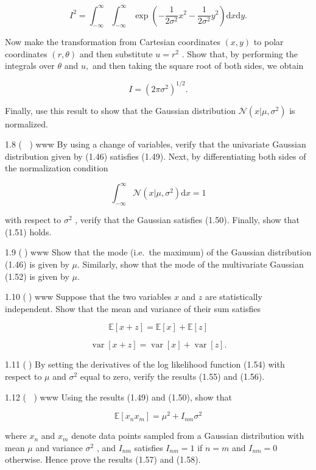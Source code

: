 \documentclass[
  10
]{article}
\begin{document}
\[
I ^ {2} = \int_ {- \infty} ^ {\infty} \int_ {- \infty} ^ {\infty} \exp \left(- \frac {1}{2 \sigma^ {2}} x ^ {2} - \frac {1}{2 \sigma^ {2}} y ^ {2}\right) \mathrm{d} x \mathrm{d} y.\tag{1.125}
\]

Now make the transformation from Cartesian coordinates \(( x , y )\) to
polar coordinates \(( r , \theta )\) and then substitute
\(u = r ^ { 2 }\) . Show that, by performing the integrals over
\(\theta\) and \(u ,\) and then taking the square root of both sides, we
obtain

\[
I = \left(2 \pi \sigma^ {2}\right) ^ {1 / 2}.\tag{1.126}
\]

Finally, use this result to show that the Gaussian distribution
\(\mathcal { N } ( x | \mu , \sigma ^ { 2 } )\) is normalized.

1.8 ( ) www By using a change of variables, verify that the univariate
Gaussian distribution given by (1.46) satisfies (1.49). Next, by
differentiating both sides of the normalization condition

\[
\int_ {- \infty} ^ {\infty} \mathcal {N} (x | \mu , \sigma^ {2}) \mathrm{d} x = 1\tag{1.127}
\]

with respect to \(\sigma ^ { 2 }\) , verify that the Gaussian satisfies
(1.50). Finally, show that (1.51) holds.

1.9 () www Show that the mode (i.e.~the maximum) of the Gaussian
distribution (1.46) is given by \(\mu .\) Similarly, show that the mode
of the multivariate Gaussian (1.52) is given by \(\mu .\)

1.10 () www Suppose that the two variables \(x\) and \(z\) are
statistically independent. Show that the mean and variance of their sum
satisfies

\[
\mathbb {E} [ x + z ] = \mathbb {E} [ x ] + \mathbb {E} [ z ]\tag{1.128}
\]

\[
\operatorname{var} [ x + z ] = \operatorname{var} [ x ] + \operatorname{var} [ z ].\tag{1.129}
\]

1.11 () \(\boldsymbol { \mathrm { B y } }\) setting the derivatives of
the log likelihood function (1.54) with respect to \(\mu\) and
\(\sigma ^ { 2 }\) equal to zero, verify the results (1.55) and (1.56).

1.12 ( ) www Using the results (1.49) and (1.50), show that

\[
\mathbb {E} [ x _ {n} x _ {m} ] = \mu^ {2} + I _ {n m} \sigma^ {2}\tag{1.130}
\]

where \(x _ { n }\) and \(x _ { m }\) denote data points sampled from a
Gaussian distribution with mean \(\mu\) and variance \(\sigma ^ { 2 }\)
, and \(I _ { n m }\) satisfies \(I _ { n m } = 1\) if \(n = m\) and
\(I _ { n m } = 0\) otherwise. Hence prove the results (1.57) and
(1.58).
\end{document}
